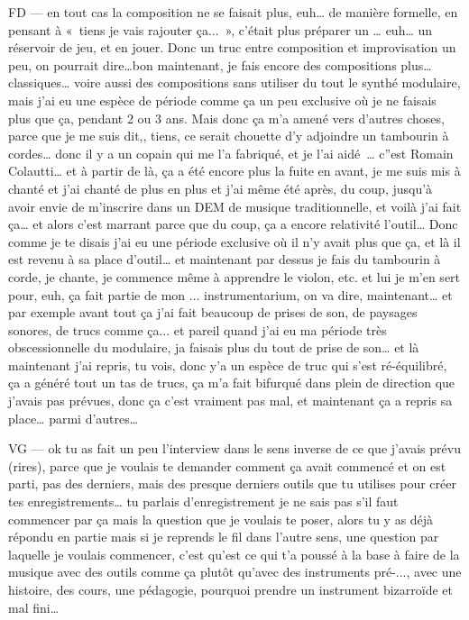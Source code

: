 FD —  en tout cas la composition ne se faisait plus, euh… de manière formelle, en pensant à « tiens je vais rajouter ça... », c'était plus préparer un … euh… un réservoir de jeu, et en jouer. Donc un truc entre composition et improvisation un peu, on pourrait dire…bon maintenant, je fais encore des compositions plus… classiques… voire aussi des compositions sans utiliser du tout le synthé modulaire, mais j'ai eu une espèce de période comme ça un peu exclusive où je ne faisais plus que ça, pendant 2 ou 3 ans. Mais donc ça m'a amené vers d'autres choses, parce que je me suis dit,, tiens, ce serait chouette d'y adjoindre un tambourin à cordes… donc il y a un copain qui me l'a fabriqué, et je l'ai aidé … c''est Romain Colautti… et à partir de là, ça a été encore plus la fuite en avant, je me suis mis à chanté et j'ai chanté de plus en plus et j'ai même été après, du coup, jusqu'à avoir envie de m'inscrire dans un DEM de musique traditionnelle, et voilà j'ai fait ça… et alors c'est marrant parce que du coup, ça a encore relativité l'outil… Donc comme je te disais j'ai eu une période exclusive où il n'y avait plus que ça, et là il est revenu à sa place d'outil… et maintenant par dessus je fais du tambourin à corde, je chante, je commence même à apprendre le violon, etc. et lui je m'en sert pour, euh, ça fait partie de mon ... instrumentarium, on va dire, maintenant… et par exemple avant tout ça j'ai fait beaucoup de prises de son, de paysages sonores, de trucs comme ça... et pareil quand j'ai eu ma période très obscessionnelle du modulaire, ja faisais plus du tout de prise de son… et là maintenant j'ai repris, tu vois, donc y'a un espèce de truc qui s'est ré-équilibré, ça a généré tout un tas de trucs, ça m'a fait bifurqué dans plein de direction que j'avais pas prévues, donc ça c'est vraiment pas mal, et maintenant ça a repris sa place… parmi d'autres… 

VG —  ok tu as fait un peu l'interview dans le sens inverse de ce que j'avais prévu (rires), parce que je voulais te demander comment ça avait commencé et on est parti, pas des derniers, mais des presque derniers outils que tu utilises pour créer tes enregistrements… tu parlais d'enregistrement je ne sais pas s'il faut commencer par ça mais la question que je voulais te poser, alors tu y as déjà répondu en partie mais si je reprends le fil dans l'autre sens, une question par laquelle je voulais commencer, c'est qu'est ce qui t'a poussé à la base à faire de la musique avec des outils comme ça plutôt qu'avec des instruments pré-..., avec une histoire, des cours, une pédagogie, pourquoi prendre un instrument bizarroïde et mal fini… 

